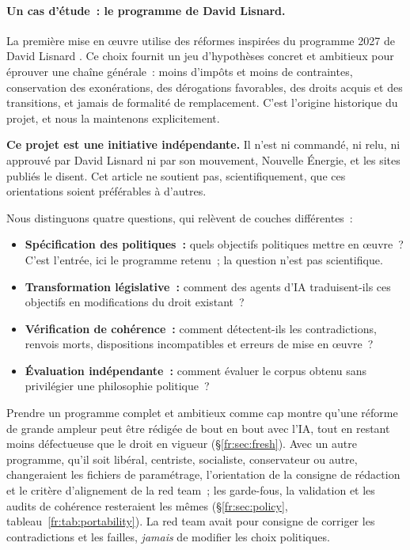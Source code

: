 \documentclass[11pt,a4paper]{article}
\begin{document}
\paragraph{Un cas d'étude~: le programme de David Lisnard.}
La première mise en \oe{}uvre utilise des réformes inspirées du programme 2027 de David Lisnard \cite{fr:lisnard}. Ce choix fournit un jeu d'hypothèses concret et ambitieux pour éprouver une chaîne générale~: moins d'impôts et moins de contraintes, conservation des exonérations, des dérogations favorables, des droits acquis et des transitions, et jamais de formalité de remplacement. C'est l'origine historique du projet, et nous la maintenons explicitement.

\textbf{Ce projet est une initiative indépendante.} Il n'est ni commandé, ni relu, ni approuvé par David Lisnard ni par son mouvement, Nouvelle Énergie, et les sites publiés le disent. Cet article ne soutient pas, scientifiquement, que ces orientations soient préférables à d'autres.

Nous distinguons quatre questions, qui relèvent de couches différentes~:
\begin{itemize}
  \item \textbf{Spécification des politiques~:} quels objectifs politiques mettre en \oe{}uvre~? C'est l'entrée, ici le programme retenu~; la question n'est pas scientifique.
  \item \textbf{Transformation législative~:} comment des agents d'IA traduisent-ils ces objectifs en modifications du droit existant~?
  \item \textbf{Vérification de cohérence~:} comment détectent-ils les contradictions, renvois morts, dispositions incompatibles et erreurs de mise en \oe{}uvre~?
  \item \textbf{Évaluation indépendante~:} comment évaluer le corpus obtenu sans privilégier une philosophie politique~?
\end{itemize}
Prendre un programme complet et ambitieux comme cap montre qu'une réforme de grande ampleur peut être rédigée de bout en bout avec l'IA, tout en restant moins défectueuse que le droit en vigueur (\S\ref{fr:sec:fresh}). Avec un autre programme, qu'il soit libéral, centriste, socialiste, conservateur ou autre, changeraient les fichiers de paramétrage, l'orientation de la consigne de rédaction et le critère d'alignement de la red team~; les garde-fous, la validation et les audits de cohérence resteraient les mêmes (\S\ref{fr:sec:policy}, tableau~\ref{fr:tab:portability}). La red team avait pour consigne de corriger les contradictions et les failles, \emph{jamais} de modifier les choix politiques.
\end{document}
